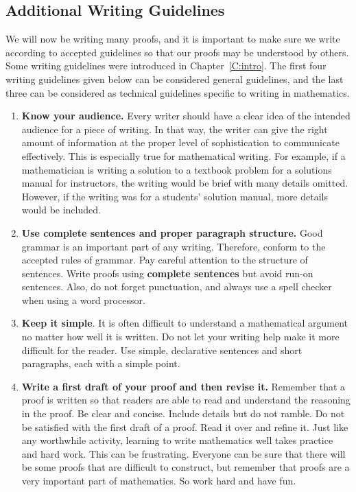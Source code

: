 \subsection*{Additional Writing Guidelines}
%
We will now be writing many proofs, and it is important to make sure we write according to accepted guidelines so that our proofs may be understood by others.  Some writing guidelines were introduced in Chapter~\ref{C:intro}.  The first four writing guidelines given below can be considered general guidelines, and the last three can be considered as technical guidelines specific to writing in mathematics.
\begin{enumerate}
\item \label{writing:know}%
\textbf{Know your audience.} 
Every writer should have a clear idea of the intended audience for a piece of writing.  In that way, the writer can give the right amount of information at the proper level of sophistication to communicate effectively.  This is especially true for mathematical writing.  For example, if a mathematician is writing a solution to a textbook problem for a solutions manual for instructors, the writing would be brief with many details omitted.  However, if the writing was for a students' solution manual, more details would be included.

\item \textbf{Use complete sentences and proper paragraph structure.}
Good grammar is an important part of any writing.  Therefore, conform to the accepted rules of grammar.  Pay careful attention to the structure of sentences.  Write proofs using \textbf{complete sentences} but avoid run-on sentences.  Also, do not forget punctuation, and always use a spell checker when using a word processor.

\item \textbf{Keep it simple}.
It is often difficult to understand a mathematical argument no matter how well it is written.  Do not let your writing help make it more difficult for the reader.  Use simple, declarative sentences and short paragraphs, each with a simple point.

\item \textbf{Write a first draft of your proof and then revise it.} 
Remember that a proof is written so that readers are able to read and understand the reasoning in the proof.  Be clear and concise.  Include details but do not ramble.  Do not be satisfied with the first draft of a proof.  Read it over and refine it.  Just like any worthwhile activity, learning to write mathematics well takes practice and hard work.  This can be frustrating.  Everyone can be sure that there will be some proofs that are difficult to construct, but remember that proofs are a very important part of mathematics.  So work hard and have fun.


\end{enumerate}
